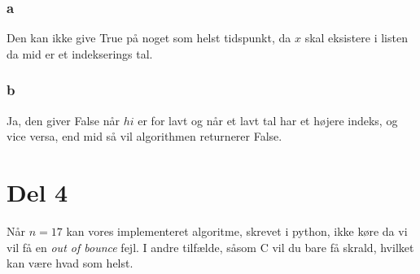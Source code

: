 \documentclass[a4paper]{article}
\begin{document}
\subsubsection*{a}
Den kan ikke give True på noget som helst tidspunkt, da $x$ skal eksistere i listen da mid er et indekserings tal.

\subsubsection*{b}
Ja, den giver False når $hi$ er for lavt og når et lavt tal har et højere indeks, og vice versa, end mid så vil algorithmen returnerer False.

\section*{Del 4}
Når $n=17$ kan vores implementeret algoritme, skrevet i python, ikke køre da vi vil få en \textit{out of bounce} fejl. I andre tilfælde, såsom C vil du bare få skrald, hvilket kan være hvad som helst. 
\end{document}
